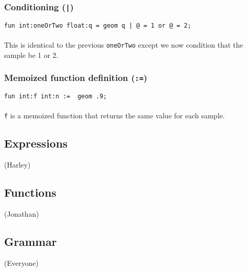 \subsubsection{Conditioning (\texttt{|})}
\texttt{fun int:oneOrTwo float:q = geom q | @ = 1 or @ = 2;}\\
\\
This is identical to the previous \texttt{oneOrTwo} except we now condition that the sample be 1 or 2.

\subsubsection{Memoized function definition (\texttt{:=})}
\texttt{fun int:f int:n := ~geom .9;}\\
\\
\texttt{f} is a memoized function that returns the same value for each sample.

\subsection{Expressions}

(Harley)

\subsection{Functions}

(Jonathan)

\subsection{Grammar}

(Everyone)

